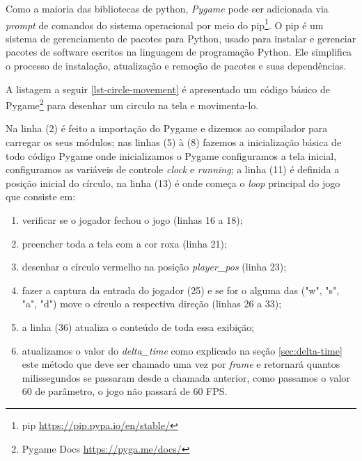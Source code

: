 Como a maioria das bibliotecas de python, \textit{Pygame} pode ser adicionada via \textit{prompt} de comandos do sistema operacional  por meio do pip\footnote{pip \url{https://pip.pypa.io/en/stable/}}. O pip é um sistema de gerenciamento de pacotes para Python, usado para instalar e gerenciar pacotes de software escritos na linguagem de programação Python. Ele simplifica o processo de instalação, atualização e remoção de pacotes e suas dependências.

A listagem a seguir \ref{lst-circle-movement} é apresentado um código básico de Pygame\footnote{Pygame Docs \url{https://pyga.me/docs/}} para desenhar um circulo na tela e movimenta-lo. 
\newpage

Na linha (2) é feito a importação do Pygame e dizemos ao compilador para carregar os seus módulos; nas linhas (5) à (8) fazemos a inicialização básica de todo código Pygame onde inicializamos o Pygame configuramos a tela inicial, configuramos as variáveis de controle \textit{clock} e \textit{running}; a linha (11) é definida a posição inicial do círculo, na linha (13) é onde começa o \textit{loop} principal do jogo que consiste em:
\begin{enumerate}
    \item verificar se o jogador fechou o jogo (linhas 16 a 18);
    \item preencher toda a tela com a cor roxa (linha 21);
    \item desenhar o círculo vermelho na posição \textit{player\_pos} (linha 23);
    \item fazer a captura da entrada do jogador (25) e se for o alguma das ("w", "s", "a", "d") move o círculo a respectiva direção (linhas 26 a 33);
    \item a linha (36) atualiza o conteúdo de toda essa exibição;
    \item atualizamos o valor do \textit{delta\_time} como explicado na seção \ref{sec:delta-time} este método que deve ser chamado uma vez por \textit{frame} e retornará quantos milissegundos se passaram desde a chamada anterior, como passamos o valor 60 de parâmetro, o jogo não passará de 60 FPS.
\end{enumerate}

